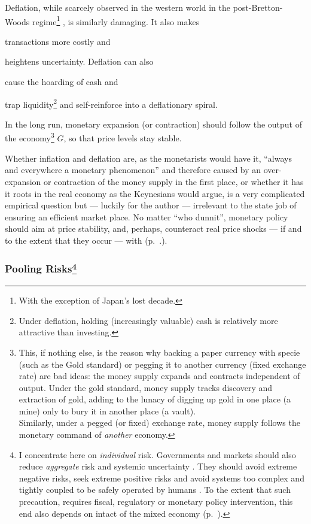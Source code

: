 Deflation, while scarcely observed in the western world in the post-Bretton-Woods regime\footnote{
	With the exception of Japan's lost decade.}%
, is similarly damaging. It also makes \begin{inparaenum}[\itshape 1\upshape)]
	\item transactions more costly and
	\item heightens uncertainty. Deflation can also
	\item cause the hoarding of cash and
	\item trap liquidity\footnote{
		Under deflation, holding (increasingly valuable) cash is relatively more attractive than investing.}
	and self-reinforce into a deflationary spiral.
	\end{inparaenum}

In the long run, monetary expansion (or contraction) should follow the output of the economy\footnote{
	This, if nothing else, is the reason why backing a paper currency with specie (such as the Gold standard) or pegging it to another currency (fixed exchange rate) are bad ideas: the money supply expands and contracts independent of output. Under the gold standard, money supply tracks discovery and extraction of gold, adding to the lunacy of digging up gold in one place (a mine) only to bury it in another place (a vault). \\
	Similarly, under a pegged (or fixed) exchange rate, money supply follows the monetary command of \emph{another} economy.}
$G$, so that price levels stay stable.

Whether inflation and deflation are, as the monetarists would have it, ``always and everywhere a monetary phenomenon'' \citep{Friedman1970} %
and therefore caused by an over-expansion or contraction of the money supply in the first place, or whether it has it roots in the real economy as the Keynesians would argue, is a very complicated empirical question but --- luckily for the author --- irrelevant to the state job of ensuring an efficient market place. No matter ``who dunnit'', monetary policy should aim at price stability, and, perhaps, counteract real price shocks --- if and to the extent that they occur --- with  (p.~\pageref{sec:monetary-stimulus}.).%

\subsubsection[Pooling Risks]{Pooling Risks\footnote{
	I concentrate here on \emph{individual} risk. Governments and markets should also reduce \emph{aggregate} risk and systemic uncertainty \citep{Knight1921}. They should avoid extreme negative risks, seek extreme positive risks \citep{Taleb2007} and avoid systems too complex and tightly coupled to be safely operated by humans \citep{Perrow-1999-aa}. To the extent that such precaution, requires fiscal, regulatory or monetary policy intervention, this end also depends on intact  of the mixed economy (p.~\pageref{sec:means}).}}
	\label{sec:risk}

